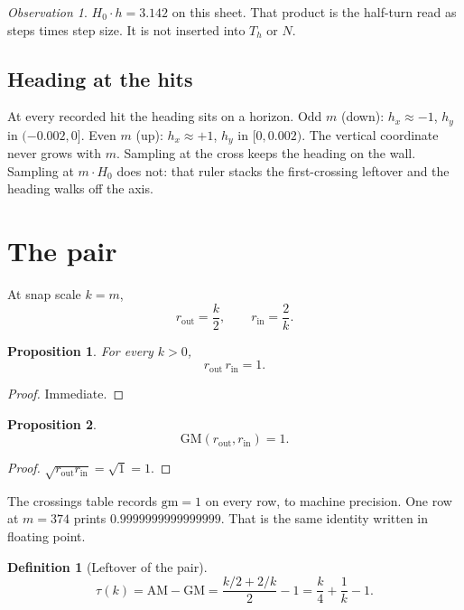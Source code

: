 \documentclass[10pt,a4paper]{article}
\theoremstyle{plain}
\newtheorem{proposition}{Proposition}
\theoremstyle{definition}
\newtheorem{definition}{Definition}
\theoremstyle{remark}
\newtheorem{observation}{Observation}
\begin{document}
\begin{observation}
\(H_0\cdot h=3.142\) on this sheet.
That product is the half-turn read as steps times step size.
It is not inserted into \(T_h\) or \(N\).
\end{observation}

\subsection{Heading at the hits}

At every recorded hit the heading sits on a horizon.
Odd \(m\) (down): \(h_x\approx -1\), \(h_y\) in \((-0.002,0]\).
Even \(m\) (up): \(h_x\approx +1\), \(h_y\) in \([0,0.002)\).
The vertical coordinate never grows with \(m\).
Sampling at the cross keeps the heading on the wall.
Sampling at \(m\cdot H_0\) does not: that ruler stacks the first-crossing leftover and the heading walks off the axis.

\section{The pair}

At snap scale \(k=m\),
\[
r_{\mathrm{out}}=\frac k2,\qquad
r_{\mathrm{in}}=\frac2k.
\]

\begin{proposition}
\label{prop:product}
For every \(k>0\),
\[
r_{\mathrm{out}}\,r_{\mathrm{in}}=1.
\]
\end{proposition}

\begin{proof}
Immediate.
\end{proof}

\begin{proposition}
\label{prop:gm}
\[
\mathrm{GM}(r_{\mathrm{out}},r_{\mathrm{in}})=1.
\]
\end{proposition}

\begin{proof}
\(\sqrt{r_{\mathrm{out}}r_{\mathrm{in}}}=\sqrt{1}=1\).
\end{proof}

The crossings table records \(\mathrm{gm}=1\) on every row, to machine precision.
One row at \(m=374\) prints \(0.9999999999999999\).
That is the same identity written in floating point.

\begin{definition}[Leftover of the pair]
\[
\tau(k)=\mathrm{AM}-\mathrm{GM}
=\frac{k/2+2/k}{2}-1
=\frac k4+\frac1k-1.
\]
\end{definition}
\end{document}
